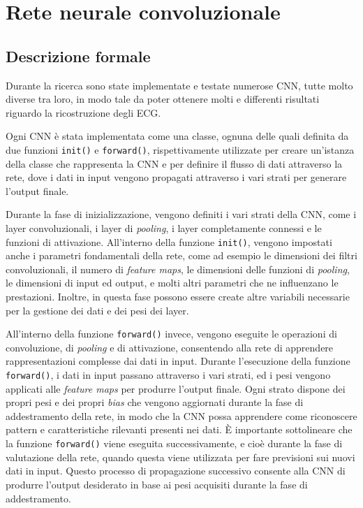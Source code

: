 \section{Rete neurale convoluzionale}
\label{sec:network}

\subsection{Descrizione formale}
\label{subsec:descrizione}

Durante la ricerca sono state implementate e testate numerose CNN, tutte molto diverse tra loro, in modo tale da poter ottenere molti e differenti risultati riguardo la ricostruzione degli ECG.

Ogni CNN è stata implementata come una classe, ognuna delle quali definita da due funzioni \texttt{init()} e \texttt{forward()}, rispettivamente utilizzate per creare un'istanza della classe che rappresenta la CNN e per definire il flusso di dati attraverso la rete, dove i dati in input vengono propagati attraverso i vari strati per generare l'output finale.

Durante la fase di inizializzazione, vengono definiti i vari strati della CNN, come i layer convoluzionali, i layer di \textit{pooling}, i layer completamente connessi e le funzioni di attivazione. All'interno della funzione \texttt{init()}, vengono impostati anche i parametri fondamentali della rete, come ad esempio le dimensioni dei filtri convoluzionali, il numero di \textit{feature maps}, le dimensioni delle funzioni di \textit{pooling}, le dimensioni di input ed output, e molti altri parametri che ne influenzano le prestazioni. Inoltre, in questa fase possono essere create altre variabili necessarie per la gestione dei dati e dei pesi dei layer.

All'interno della funzione \texttt{forward()} invece, vengono eseguite le operazioni di convoluzione, di \textit{pooling} e di attivazione, consentendo alla rete di apprendere rappresentazioni complesse dai dati in input. Durante l'esecuzione della funzione \texttt{forward()}, i dati in input passano attraverso i vari strati, ed i pesi vengono applicati alle \textit{feature maps} per produrre l'output finale. Ogni strato dispone dei propri pesi e dei propri \textit{bias} che vengono aggiornati durante la fase di addestramento della rete, in modo che la CNN possa apprendere come riconoscere pattern e caratteristiche rilevanti presenti nei dati. È importante sottolineare che la funzione \texttt{forward()} viene eseguita successivamente, e cioè durante la fase di valutazione della rete, quando questa viene utilizzata per fare previsioni sui nuovi dati in input. Questo processo di propagazione successivo consente alla CNN di produrre l'output desiderato in base ai pesi acquisiti durante la fase di addestramento.

